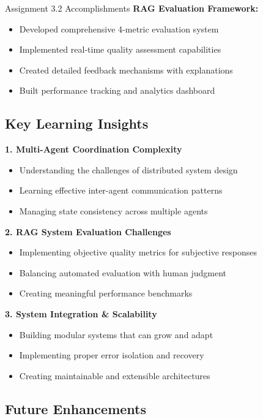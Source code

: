 \documentclass[12pt,a4paper]{article}
\begin{document}
\begin{infobox}{Assignment 3.2 Accomplishments}
\textbf{RAG Evaluation Framework:}
\begin{itemize}
    \item Developed comprehensive 4-metric evaluation system
    \item Implemented real-time quality assessment capabilities
    \item Created detailed feedback mechanisms with explanations
    \item Built performance tracking and analytics dashboard
\end{itemize}
\end{infobox}

\subsection{Key Learning Insights}

\textbf{1. Multi-Agent Coordination Complexity}
\begin{itemize}
    \item Understanding the challenges of distributed system design
    \item Learning effective inter-agent communication patterns
    \item Managing state consistency across multiple agents
\end{itemize}

\textbf{2. RAG System Evaluation Challenges}
\begin{itemize}
    \item Implementing objective quality metrics for subjective responses
    \item Balancing automated evaluation with human judgment
    \item Creating meaningful performance benchmarks
\end{itemize}

\textbf{3. System Integration \& Scalability}
\begin{itemize}
    \item Building modular systems that can grow and adapt
    \item Implementing proper error isolation and recovery
    \item Creating maintainable and extensible architectures
\end{itemize}

\subsection{Future Enhancements}
\end{document}
